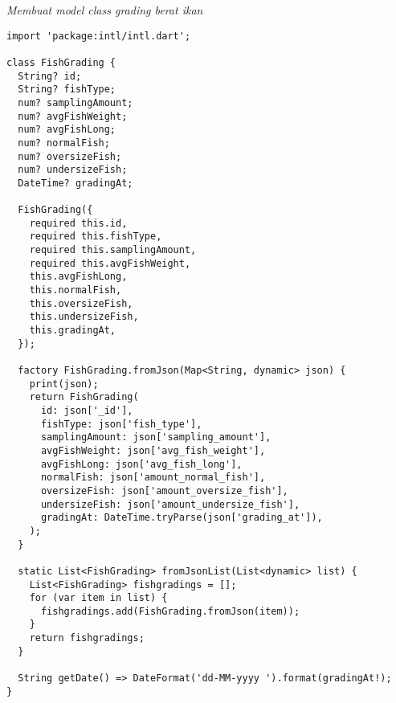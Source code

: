 	\textit{Membuat model class grading berat ikan}
	\begin{lstlisting}
import 'package:intl/intl.dart';

class FishGrading {
  String? id;
  String? fishType;
  num? samplingAmount;
  num? avgFishWeight;
  num? avgFishLong;
  num? normalFish;
  num? oversizeFish;
  num? undersizeFish;
  DateTime? gradingAt;

  FishGrading({
    required this.id,
    required this.fishType,
    required this.samplingAmount,
    required this.avgFishWeight,
    this.avgFishLong,
    this.normalFish,
    this.oversizeFish,
    this.undersizeFish,
    this.gradingAt,
  });

  factory FishGrading.fromJson(Map<String, dynamic> json) {
    print(json);
    return FishGrading(
      id: json['_id'],
      fishType: json['fish_type'],
      samplingAmount: json['sampling_amount'],
      avgFishWeight: json['avg_fish_weight'],
      avgFishLong: json['avg_fish_long'],
      normalFish: json['amount_normal_fish'],
      oversizeFish: json['amount_oversize_fish'],
      undersizeFish: json['amount_undersize_fish'],
      gradingAt: DateTime.tryParse(json['grading_at']),
    );
  }

  static List<FishGrading> fromJsonList(List<dynamic> list) {
    List<FishGrading> fishgradings = [];
    for (var item in list) {
      fishgradings.add(FishGrading.fromJson(item));
    }
    return fishgradings;
  }

  String getDate() => DateFormat('dd-MM-yyyy ').format(gradingAt!);
}
	\end{lstlisting}

